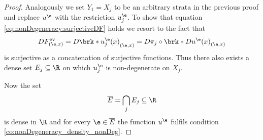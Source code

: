\begin{proof}
  Analogously we set $Y_1=X_j$ to be an arbitrary strata in the previous proof and replace
  $u^\e$ with the restriction $u_j^\e$. To show that
  equation \eqref{eq:nonDegeneracy:surjectiveDF} holds we resort to the fact that
  \begin{align*}
    DF^\text{ev}_{(\e,x)}
    =D\brk*{u_j^\e(x)}_{(\e,x)}
    =D\pi_j\circ \brk*{Du^\e(x)}_{(\e,x)}
  \end{align*}
  is surjective as a concatenation of surjective functions.
  Thus there also exists a dense set $E_j\subseteq\R$ on which $u^\e_j$ is
  non-degenerate on $X_j$.

  
  
  Now the set
  \begin{align}
    \overline{E}=\bigcap_j E_j\subseteq\R
  \end{align}
  is dense in $\R$ and
  for every $\e\in\overline{E}$ the function $u^\e$ fulfils condition
  \ref{co:nonDegeneracy_density_nonDeg}.


\end{proof}
